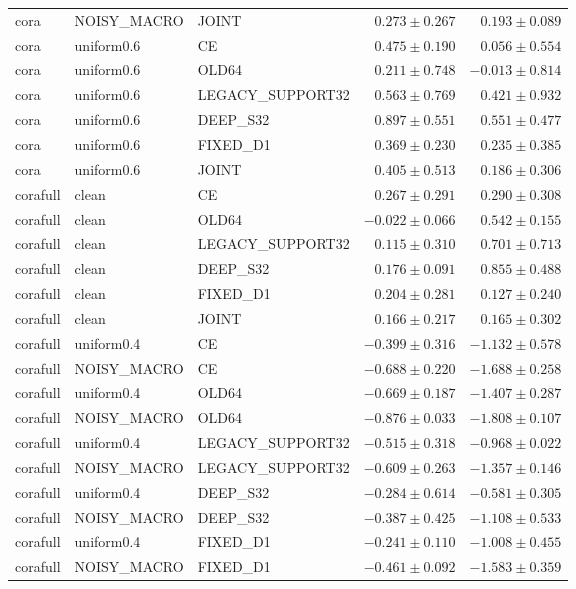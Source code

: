 \begin{longtable}{lllrr}
cora & NOISY\_MACRO & JOINT & $0.273 \pm 0.267$ & $0.193 \pm 0.089$ \\
cora & uniform0.6 & CE & $0.475 \pm 0.190$ & $0.056 \pm 0.554$ \\
cora & uniform0.6 & OLD64 & $0.211 \pm 0.748$ & $-0.013 \pm 0.814$ \\
cora & uniform0.6 & LEGACY\_SUPPORT32 & $0.563 \pm 0.769$ & $0.421 \pm 0.932$ \\
cora & uniform0.6 & DEEP\_S32 & $0.897 \pm 0.551$ & $0.551 \pm 0.477$ \\
cora & uniform0.6 & FIXED\_D1 & $0.369 \pm 0.230$ & $0.235 \pm 0.385$ \\
cora & uniform0.6 & JOINT & $0.405 \pm 0.513$ & $0.186 \pm 0.306$ \\
corafull & clean & CE & $0.267 \pm 0.291$ & $0.290 \pm 0.308$ \\
corafull & clean & OLD64 & $-0.022 \pm 0.066$ & $0.542 \pm 0.155$ \\
corafull & clean & LEGACY\_SUPPORT32 & $0.115 \pm 0.310$ & $0.701 \pm 0.713$ \\
corafull & clean & DEEP\_S32 & $0.176 \pm 0.091$ & $0.855 \pm 0.488$ \\
corafull & clean & FIXED\_D1 & $0.204 \pm 0.281$ & $0.127 \pm 0.240$ \\
corafull & clean & JOINT & $0.166 \pm 0.217$ & $0.165 \pm 0.302$ \\
corafull & uniform0.4 & CE & $-0.399 \pm 0.316$ & $-1.132 \pm 0.578$ \\
corafull & NOISY\_MACRO & CE & $-0.688 \pm 0.220$ & $-1.688 \pm 0.258$ \\
corafull & uniform0.4 & OLD64 & $-0.669 \pm 0.187$ & $-1.407 \pm 0.287$ \\
corafull & NOISY\_MACRO & OLD64 & $-0.876 \pm 0.033$ & $-1.808 \pm 0.107$ \\
corafull & uniform0.4 & LEGACY\_SUPPORT32 & $-0.515 \pm 0.318$ & $-0.968 \pm 0.022$ \\
corafull & NOISY\_MACRO & LEGACY\_SUPPORT32 & $-0.609 \pm 0.263$ & $-1.357 \pm 0.146$ \\
corafull & uniform0.4 & DEEP\_S32 & $-0.284 \pm 0.614$ & $-0.581 \pm 0.305$ \\
corafull & NOISY\_MACRO & DEEP\_S32 & $-0.387 \pm 0.425$ & $-1.108 \pm 0.533$ \\
corafull & uniform0.4 & FIXED\_D1 & $-0.241 \pm 0.110$ & $-1.008 \pm 0.455$ \\
corafull & NOISY\_MACRO & FIXED\_D1 & $-0.461 \pm 0.092$ & $-1.583 \pm 0.359$ \\

\end{longtable}
